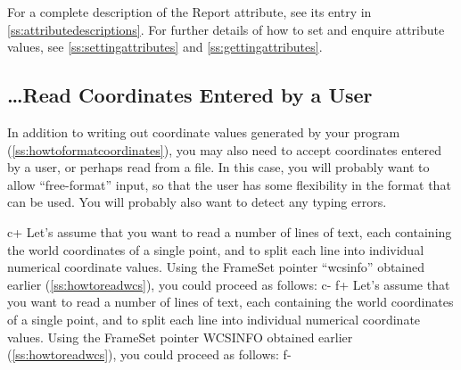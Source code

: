 \documentclass[twoside,11pt]{article}
\newcommand{\appref}[1]{Appendix~\ref{#1}}
\newcommand{\secref}[1]{\S\ref{#1}}
\renewcommand{\appref}[1]{\ref{#1}}
\renewcommand{\secref}[1]{\ref{#1}}
\begin{document}
For a complete description of the Report attribute, see its entry in
\appref{ss:attributedescriptions}.  For further details of how to set
and enquire attribute values, see \secref{ss:settingattributes} and
\secref{ss:gettingattributes}.

\subsection{\ldots Read Coordinates Entered by a User}

In addition to writing out coordinate values generated by your program
(\secref{ss:howtoformatcoordinates}), you may also need to accept
coordinates entered by a user, or perhaps read from a file. In this
case, you will probably want to allow ``free-format'' input, so that
the user has some flexibility in the format that can be used. You will
probably also want to detect any typing errors.

c+
Let's assume that you want to read a number of lines of text, each
containing the world coordinates of a single point, and to split each
line into individual numerical coordinate values. Using the FrameSet
pointer ``wcsinfo'' obtained earlier (\secref{ss:howtoreadwcs}), you
could proceed as follows:
c-
f+
Let's assume that you want to read a number of lines of text, each
containing the world coordinates of a single point, and to split each
line into individual numerical coordinate values. Using the FrameSet
pointer WCSINFO obtained earlier (\secref{ss:howtoreadwcs}), you could
proceed as follows:
f-
\end{document}
